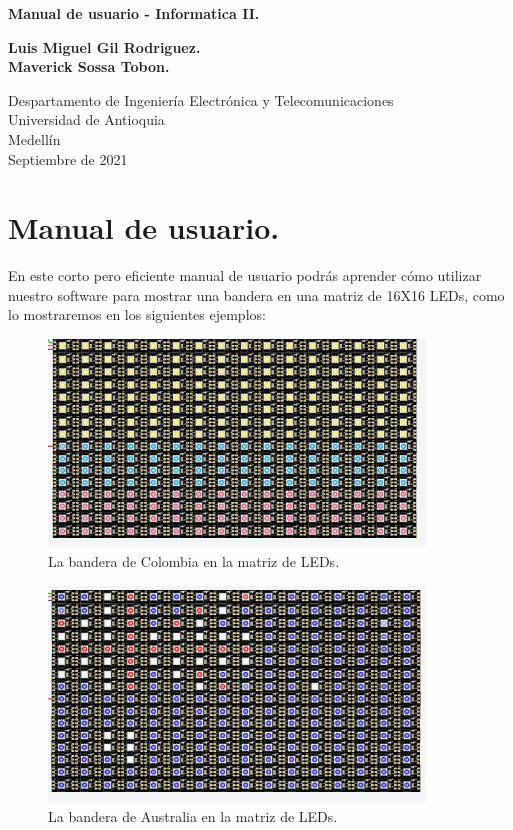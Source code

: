 \documentclass{article}
\begin{document}
\begin{titlepage}
    \begin{center}
        \vspace*{1cm}
            
        \Huge
        \textbf{Manual de usuario - Informatica II.}
            
        \vspace{0.5cm}
        \LARGE
            
        \vspace{1.5cm}
            
        \textbf{Luis Miguel Gil Rodriguez.}
        \\
        \textbf{Maverick Sossa Tobon.}
        \vfill
        \vspace{0.8cm}
            
        \Large
        Despartamento de Ingeniería Electrónica y Telecomunicaciones\\
        Universidad de Antioquia\\
        Medellín\\
        Septiembre de 2021
            
    \end{center}
\end{titlepage}
\tableofcontents
\newpage
\section{Manual de usuario.} \label{intro}
En este corto pero eficiente manual de usuario podrás aprender cómo utilizar nuestro software para mostrar una bandera en una matriz de 16X16 LEDs, como lo mostraremos en los siguientes ejemplos:
\begin{figure}[h]
  \includegraphics[width=10cm]{Colombia.jpg}
  \centering
  \caption{La bandera de Colombia en la matriz de LEDs.}
  \label{fig:Colombia}
\end{figure}
\begin{figure}[h]
  \includegraphics[width=10cm]{Australia.jpg}
  \centering
  \caption{La bandera de Australia en la matriz de LEDs.}
  \label{fig:Colombia}
\end{figure}
\end{document}
